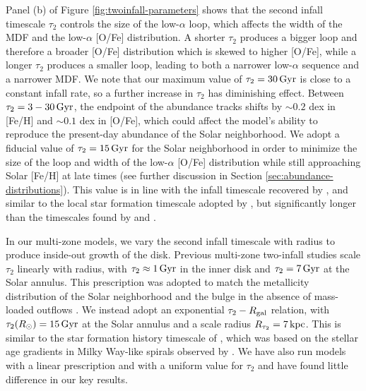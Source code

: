 \documentclass[twocolumn,twocolappendix,linenumbers]{aastex631}
\newcommand{\todo}[1]{{\color{red}#1}}
\newcommand{\kpc}{\,{\rm kpc}}
\newcommand{\Gyr}{\,{\rm Gyr}}
\begin{document}
Panel (b) of Figure \ref{fig:twoinfall-parameters} shows that 
the second infall timescale $\tau_2$ controls the size of the low-$\alpha$ loop, which affects the width of the MDF and the low-$\alpha$ [O/Fe] distribution. A shorter $\tau_2$ produces a bigger loop and therefore a broader [O/Fe] distribution which is skewed to higher [O/Fe], while a longer $\tau_2$ produces a smaller loop, leading to both a narrower low-$\alpha$ sequence and a narrower MDF. We note that our maximum value of $\tau_2=30\,{\rm Gyr}$ is close to a constant infall rate, so a further increase in $\tau_2$ has diminishing effect. Between $\tau_2=3-30\,{\rm Gyr}$, the endpoint of the abundance tracks shifts by $\sim0.2$ dex in [Fe/H] and $\sim0.1$ dex in [O/Fe], which could affect the model's ability to reproduce the present-day abundance of the Solar neighborhood. We adopt a fiducial value of $\tau_2=15\,{\rm Gyr}$ for the Solar neighborhood in order to minimize the size of the loop and width of the low-$\alpha$ [O/Fe] distribution while still approaching Solar [Fe/H] at late times (see further discussion in Section \ref{sec:abundance-distributions}). This value is in line with the infall timescale recovered by \citet{spitoni_galactic_2020}, and similar to the local star formation timescale adopted by \citet{johnson_stellar_2021}, but significantly longer than the timescales found by \citet{nissen_high-precision_2020} and \citet{spitoni_apogee_2021}. 

In our multi-zone models, we vary the second infall timescale with radius to produce inside-out growth of the disk. Previous multi-zone two-infall studies \citep[e.g.,][]{chiappini_abundance_2001,palla_chemical_2020} scale $\tau_2$ linearly with radius, with $\tau_2\approx1\Gyr$ in the inner disk and $\tau_2=7\Gyr$ at the Solar annulus. This prescription was adopted to match the metallicity distribution of the Solar neighborhood and the bulge in the absence of mass-loaded outflows \citep{romano_mass_2000}. We instead adopt an exponential $\tau_2 - R_{\rm gal}$ relation, with $\tau_2(R_\odot)=15\Gyr$ at the Solar annulus and a scale radius $R_{\tau_2}=7\kpc$. This is similar to the star formation history timescale of \citet{johnson_stellar_2021}, which was based on the  stellar age gradients in Milky Way-like spirals observed by \citet{sanchez_spatially_2020}. We have also run models with a linear prescription and with a uniform value for $\tau_2$ and have found little difference in our key results.
\end{document}
